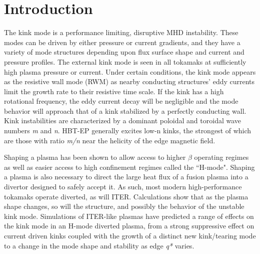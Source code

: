\documentclass[aps,preprint,showpacs,superscriptaddress,groupedaddress]{revtex4}  %
\begin{document}
\section{Introduction}
The kink mode is a performance limiting, disruptive MHD instability\cite{Strait}.  These modes can be driven by either pressure or current gradients, and they have a variety of mode structures depending upon flux surface shape and current and pressure profiles.  The external kink mode is seen in all tokamaks at sufficiently high plasma pressure or current.  Under certain conditions, the kink mode appears as the resistive wall mode (RWM) as nearby conducting structures' eddy currents limit the growth rate to their resistive time scale.  If the kink has a high rotational frequency, the eddy current decay will be negligible and the mode behavior will approach that of a kink stabilized by a perfectly conducting wall.  Kink instabilities are characterized by a dominant poloidal and toroidal wave numbers \textit{m} and \textit{n}.  HBT-EP generally excites low-n kinks, the strongest of which are those with ratio \textit{m/n} near the helicity of the edge magnetic field.\par
	Shaping a plasma has been shown to allow access to higher $\beta$ operating regimes as well as easier access to high confinement regimes called the ``H-mode"\citep{Lazarus, Keilhacker_HMode}. Shaping a plasma is also necessary to direct the large heat flux of a fusion plasma into a divertor designed to safely accept it.  As such, most modern high-performance tokamaks operate diverted, as will ITER.  Calculations show that as the plasma shape changes, so will the structure, and possibly the behavior of the unstable kink mode.  Simulations of ITER-like plasmas have predicted a range of effects on the kink mode in an H-mode diverted plasma, from a strong suppressive effect on current driven kinks coupled with the growth of a distinct new kink/tearing mode\cite{Huysmans} to a change in the mode shape and stability as edge \textit{q*} varies\cite{Maurer}.\par
\end{document}
